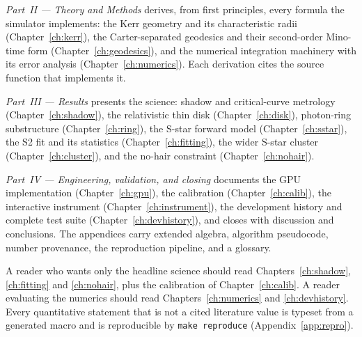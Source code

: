 \emph{Part~II — Theory and Methods} derives, from first principles, every
formula the simulator implements: the Kerr geometry and its characteristic
radii (Chapter~\ref{ch:kerr}), the Carter-separated geodesics and their
second-order Mino-time form (Chapter~\ref{ch:geodesics}), and the numerical
integration machinery with its error analysis (Chapter~\ref{ch:numerics}).
Each derivation cites the source function that implements it.

\emph{Part~III — Results} presents the science: shadow and critical-curve
metrology (Chapter~\ref{ch:shadow}), the relativistic thin disk
(Chapter~\ref{ch:disk}), photon-ring substructure (Chapter~\ref{ch:ring}),
the S-star forward model (Chapter~\ref{ch:sstar}), the S2 fit and its
statistics (Chapter~\ref{ch:fitting}), the wider S-star cluster
(Chapter~\ref{ch:cluster}), and the no-hair constraint
(Chapter~\ref{ch:nohair}).

\emph{Part~IV — Engineering, validation, and closing} documents the GPU
implementation (Chapter~\ref{ch:gpu}), the \sgra{} calibration
(Chapter~\ref{ch:calib}), the interactive instrument
(Chapter~\ref{ch:instrument}), the development history and complete test
suite (Chapter~\ref{ch:devhistory}), and closes with discussion and
conclusions. The appendices carry extended algebra, algorithm pseudocode,
number provenance, the reproduction pipeline, and a glossary.

A reader who wants only the headline science should read
Chapters~\ref{ch:shadow}, \ref{ch:fitting} and \ref{ch:nohair}, plus the
calibration of Chapter~\ref{ch:calib}. A reader evaluating the numerics
should read Chapters~\ref{ch:numerics} and \ref{ch:devhistory}. Every
quantitative statement that is not a cited literature value is typeset from
a generated macro and is reproducible by \texttt{make reproduce}
(Appendix~\ref{app:repro}).
